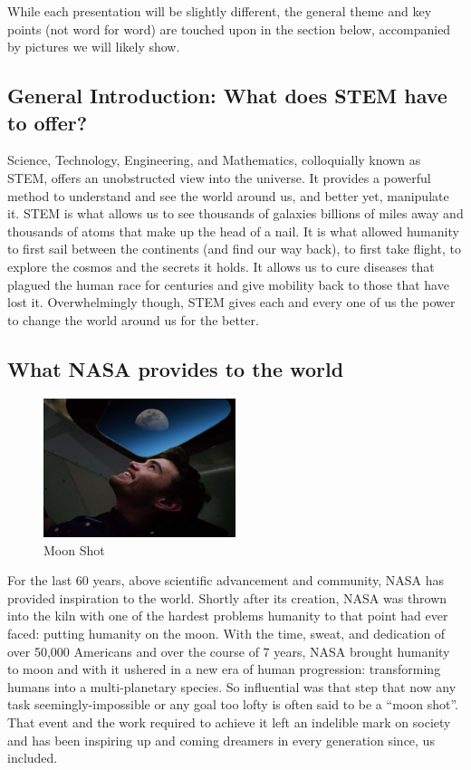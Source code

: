 \documentclass{article}
\let\Oldsubsection\subsection
\renewcommand{\subsection}{\FloatBarrier\Oldsubsection}
\begin{document}
While each presentation will be slightly different, the general theme 
and key points (not word for word) are touched upon in the section 
below, accompanied by pictures we will likely show.

\subsection{General Introduction: What does STEM have to offer?}

Science, Technology, Engineering, and Mathematics, colloquially known as 
STEM, offers an unobstructed view into the universe. It provides a 
powerful method to understand and see the world around us, and better 
yet, manipulate it. STEM is what allows us to see thousands of galaxies 
billions of miles away and thousands of atoms that make up the head of a 
nail. It is what allowed humanity to first sail between the continents 
(and find our way back), to first take flight, to explore the cosmos and 
the secrets it holds. It allows us to cure diseases that plagued the 
human race  for centuries and give mobility back to those that have lost 
it. Overwhelmingly  though, STEM gives each and every one of us the 
power to change the world around us for the better.

\subsection{What NASA provides to the world}

\begin{figure}[!htb]
  \centering
  \includegraphics[width=0.5\textwidth]{assets/smilingatthemoon.jpg}
  \caption{Moon Shot}
  \label{fig:smilingatthemoon}
\end{figure}

For the last 60 years, above scientific advancement and community, NASA 
has provided inspiration to the world. Shortly after its creation, NASA 
was thrown into the kiln with one of the hardest problems humanity to 
that point had ever faced: putting humanity on the moon. With the time, 
sweat, and dedication of over 50,000 Americans and over the course of 7 
years, NASA brought humanity to moon and with it ushered in a new era of 
human progression: transforming humans into a multi-planetary species. 
So influential was that step that now any task seemingly-impossible or 
any goal too lofty is often said to be a “moon shot”. That event and the 
work required to achieve it left an indelible mark on society and has 
been inspiring up and coming dreamers in every generation since, us 
included. 
\end{document}
